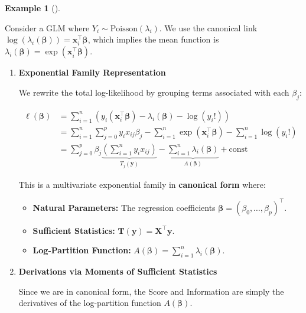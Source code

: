 \documentclass[
  letterpaper,
  DIV=11,
  numbers=noendperiod]{scrreprt}
\providecommand{\tightlist}{%
  \setlength{\itemsep}{0pt}\setlength{\parskip}{0pt}}
\renewcommand{\[}{\begin{equation}}
\renewcommand{\]}{\end{equation}}
\theoremstyle{definition}
\theoremstyle{plain}
\theoremstyle{plain}
\theoremstyle{plain}
\theoremstyle{definition}
\newtheorem{example}{Example}[chapter]
\theoremstyle{plain}
\theoremstyle{remark}
\begin{document}
\begin{example}[]\protect\hypertarget{exm-poisson-glm}{}\label{exm-poisson-glm}

Consider a GLM where \(Y_i \sim \text{Poisson}(\lambda_i)\). We use the
canonical link
\(\log(\lambda_i(\boldsymbol{\beta})) = \mathbf{x}_i^\top \boldsymbol{\beta}\),
which implies the mean function is
\(\lambda_i(\boldsymbol{\beta}) = \exp(\mathbf{x}_i^\top \boldsymbol{\beta})\).

\begin{enumerate}
\def\labelenumi{\arabic{enumi}.}
\item
  \textbf{Exponential Family Representation}

  We rewrite the total log-likelihood by grouping terms associated with
  each \(\beta_j\):

  \[
   \begin{aligned}
   \ell(\boldsymbol{\beta}) &= \sum_{i=1}^n \left( y_i (\mathbf{x}_i^\top \boldsymbol{\beta}) - \lambda_i(\boldsymbol{\beta}) - \log(y_i!) \right) \\
   &= \sum_{i=1}^n \sum_{j=0}^p y_i x_{ij} \beta_j - \sum_{i=1}^n \exp(\mathbf{x}_i^\top \boldsymbol{\beta}) - \sum_{i=1}^n \log(y_i!) \\
   &= \sum_{j=0}^p \beta_j \underbrace{\left( \sum_{i=1}^n y_i x_{ij} \right)}_{T_j(\mathbf{y})} - \underbrace{\sum_{i=1}^n \lambda_i(\boldsymbol{\beta})}_{A(\boldsymbol{\beta})} + \text{const}
   \end{aligned}
   \]

  This is a multivariate exponential family in \textbf{canonical form}
  where:

  \begin{itemize}
  \tightlist
  \item
    \textbf{Natural Parameters:} The regression coefficients
    \(\boldsymbol{\beta} = (\beta_0, \dots, \beta_p)^\top\).
  \item
    \textbf{Sufficient Statistics:}
    \(\mathbf{T}(\mathbf{y}) = \mathbf{X}^\top \mathbf{y}\).
  \item
    \textbf{Log-Partition Function:}
    \(A(\boldsymbol{\beta}) = \sum_{i=1}^n \lambda_i(\boldsymbol{\beta})\).
  \end{itemize}
\item
  \textbf{Derivations via Moments of Sufficient Statistics}

  Since we are in canonical form, the Score and Information are simply
  the derivatives of the log-partition function
  \(A(\boldsymbol{\beta})\).


\end{enumerate}
\end{example}
\end{document}
